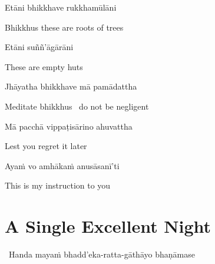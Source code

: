 \begin{verses}
  Etāni bhikkhave rukkhamūlāni
\end{verses}

\begin{english}
  Bhikkhus these are roots of trees
\end{english}

\begin{verses}
  Etāni suññ'āgārāni
\end{verses}

\begin{english}
  These are empty huts
\end{english}

\begin{verses}
  Jhāyatha bhikkhave mā pamādattha
\end{verses}

\begin{english}
  Meditate bhikkhus \breathmark\ do not be negligent
\end{english}

\begin{verses}
  Mā pacchā vippaṭisārino ahuvattha
\end{verses}

\begin{english}
  Lest you regret it later
\end{english}

\begin{verses}
  Ayaṁ vo amhākaṁ anusāsanī'ti
\end{verses}

\begin{english}
  This is my instruction to you
\end{english}

\suttaRef{[MN 19]}


\section{A Single Excellent Night}
\label{single-excellent-night}

\begin{leader}
  \anglebracketleft\ \hspace{-0.5mm}Handa mayaṁ bhadd'eka-ratta-gāthāyo bhaṇāmase \hspace{-0.5mm}\anglebracketright\
\end{leader}

